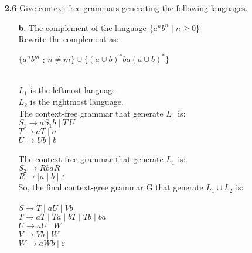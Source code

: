\documentclass[12pt]{letter}
\begin{document}
\begin{enumerate}
\newpage
\item[\textbf{2.6}] Give context-free grammars generating the following languages.\\
\begin{enumerate}
	\item[\textbf{b}.] The complement of the language \{$a^nb^n \mid n \geq $0\}
	\leavevmode \\
	Rewrite the complement as: \\
	\begin{center} $\{a^nb^m$ : $ n \neq m\} \cup \{(a\cup b)^*ba(a \cup b)^*\}$\end{center}
	\ \\ %
	$L_1$ is the leftmost language. \\
	$L_2$ is the rightmost language. \\

	The context-free grammar that generate $L_1$ is: \\
	\setlength\parindent{100pt} 
	$S_1 \rightarrow aS_1b \mid T \ U$ \\
	$T \rightarrow aT \mid a$ \\
	$U \rightarrow Ub \mid b$
	\setlength\parindent{0pt} 

  The context-free grammar that generate $L_1$ is: \\
	\setlength\parindent{100pt} 
	$S_2 \rightarrow RbaR$ \\
	$R \rightarrow \mid a \mid b \mid \varepsilon$\\
	\setlength\parindent{0pt} 
	So, the final context-gree grammar G that generate $L_1 \cup L_2$ is: \\
	\leavevmode \\
	\setlength\parindent{100pt} 
	$S \rightarrow T \mid aU \mid Vb $\\
	$T \rightarrow aT \mid Ta \mid bT \mid Tb \mid ba$ \\
	$U \rightarrow aU \mid W$\\
	$V \rightarrow Vb \mid W$\\
	$W \rightarrow aWb \mid \varepsilon$\\
	\setlength\parindent{0pt} 



\end{enumerate}
\end{enumerate}
\end{document}
